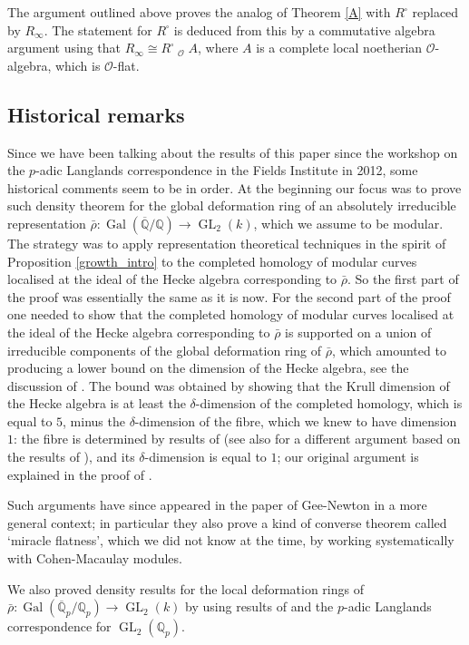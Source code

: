\documentclass[JEP,XML,SOM,Unicode,NoEqCountersInSection]{cedram}
\let\mathcal\mathscr
\newcommand{\ssquare}{{\scriptscriptstyle\square}}
\theoremstyle{definition}
\DeclareMathOperator{\GL}{GL}
\DeclareMathOperator{\Gal}{Gal}
\DeclareMathOperator{\wtimes}{\widehat{\otimes}}
\newcommand{\Qp}{\mathbb {Q}_p}
\newcommand{\Qbar}{\overline{\mathbb{Q}}_p}
\newcommand{\QQ}{\mathbb Q}
\newcommand{\cO}{\mathcal{O}}
\newcommand{\rhobar}{\bar{\rho}}
\begin{document}
The argument outlined above proves the analog of Theorem \ref{A} with $R^\ssquare$ replaced by $R_{\infty}$. The statement for $R^\ssquare$ is deduced from this by a commutative algebra argument using that $R_\infty\cong R^\ssquare\wtimes_{\cO} A$, where $A$ is a complete local noetherian $\cO$-algebra, which is $\cO$-flat.

\subsection{Historical remarks} Since we have been talking about the results of this paper
since the workshop on the $p$-adic Langlands correspondence in the Fields Institute in 2012, some historical comments seem to be in order.
At the beginning our focus was to prove such density theorem for the global deformation ring
of an absolutely irreducible representation $\rhobar: \Gal(\overline{\QQ}/ \QQ)\to \GL_2(k)$,
which we assume to be modular. The strategy was to apply representation theoretical techniques in the
spirit of Proposition \ref{growth_intro} to the completed homology of modular curves localised at the ideal of the Hecke algebra corresponding to $\rhobar$. So the first part of the proof
was essentially the same as it is now. For the second part of the proof one needed to show that the completed homology of modular curves localised at the ideal of the Hecke algebra corresponding to $\rhobar$ is supported on a union of irreducible components of the global deformation ring of $\rhobar$, which amounted to producing a lower bound on the dimension of the Hecke algebra, see the discussion of
\cite[\S 3.1.1]{matt_icm}. The bound was obtained by showing that the Krull dimension of the Hecke
algebra is at least the $\delta$-dimension of the completed homology, which is equal to $5$, minus the
$\delta$-dimension of the fibre, which we knew to have dimension $1$: the fibre is determined by results
of \cite{emfm} (see also \cite[Lem.\,5.8]{padicJL} for a different argument based on the results of
\cite{cmf}), and its $\delta$-dimension is equal to $1$; our original argument is explained in the proof of
\cite[Lem.\,5.14]{padicJL}.

Such arguments have since appeared in the paper of Gee-Newton \cite{gee-newton}
in a more general context; in particular they also prove a kind of converse theorem called `miracle flatness', which we did not know at the time, by working systematically with Cohen-Macaulay modules.

We also proved density results
for the local deformation rings of $\rhobar: \Gal(\Qbar/\Qp)\to \GL_2(k)$ by using results of \cite{cmf} and the $p$-adic Langlands correspondence for $\GL_2(\Qp)$.
\end{document}
